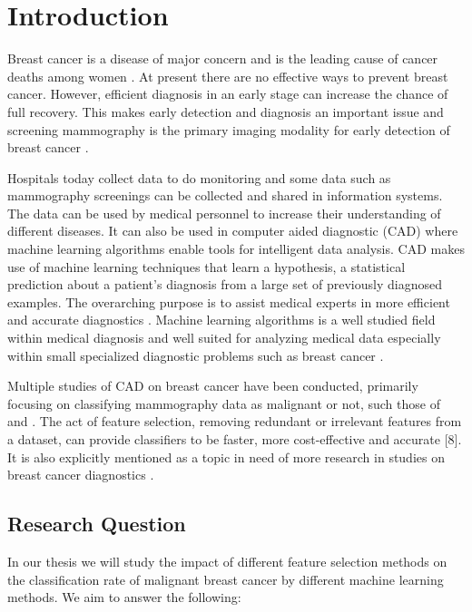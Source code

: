 \chapter{Introduction}

Breast cancer is a disease of major concern and is the leading cause of cancer deaths among women \parencite{althuis2005}. At present there are no effective ways to prevent breast cancer. However, efficient diagnosis in an early stage can increase the chance of full recovery. This makes early detection and diagnosis an important issue and screening mammography is the primary imaging modality for early detection of breast cancer \parencite{tabar2001}.

Hospitals today collect data to do monitoring and some data such as mammography screenings can be collected and shared in information systems. The data can be used by medical personnel to increase their understanding of different diseases. It can also be used in computer aided diagnostic (CAD) where machine learning algorithms enable tools for intelligent data analysis. CAD makes use of machine learning techniques that learn a hypothesis, a statistical prediction about a patient's diagnosis from a large set of previously diagnosed examples.  The overarching purpose is to assist medical experts in more efficient and accurate diagnostics \parencite{li2007}. Machine learning algorithms is a well studied field within medical diagnosis and well suited for analyzing medical data especially within small specialized diagnostic problems such as breast cancer \parencite{kononenko2001}.

Multiple studies of CAD on breast cancer have been conducted, primarily focusing on classifying mammography data as malignant or not, such those of \textcite{ramos2012} and \textcite{akay2009}. The act of feature selection, removing redundant or irrelevant features from a dataset, can provide classifiers to be faster, more cost-effective and accurate [8]. It is also explicitly mentioned as a topic in need of more research in studies on breast cancer diagnostics \parencite{akin2011}.


\section{Research Question}

In our thesis we will study the impact of different feature selection methods on the classification rate of malignant breast cancer by different machine learning methods. We aim to answer the following:


